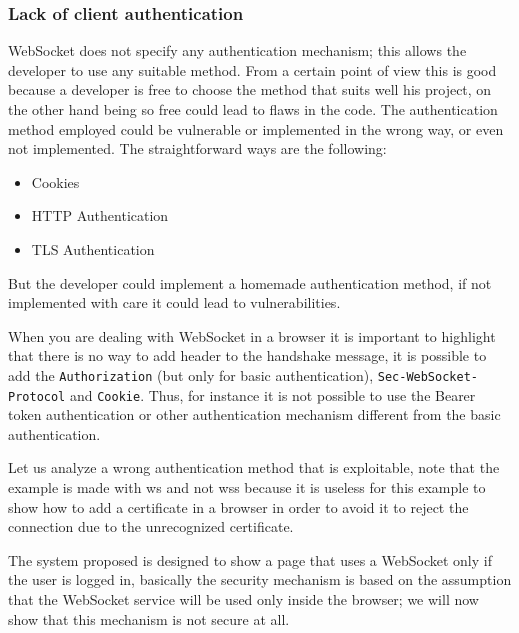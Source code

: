 	
	\subsubsection{Lack of client authentication}\label{sssec:lack}
	WebSocket does not specify any authentication mechanism; this allows the developer to use any suitable method.
	From a certain point of view this is good because a developer is free to choose the method that suits well his project, on the other hand being so free could lead to flaws in the code.\newline
	The authentication method employed could be vulnerable or implemented in the wrong way, or even not implemented.\newline
	The straightforward ways are the following:
	\begin{itemize}
		\item Cookies
		\item HTTP Authentication
		\item TLS Authentication
	\end{itemize}

	But the developer could implement a homemade authentication method, if not implemented with care it could lead to vulnerabilities.\newline
	
	When you are dealing with WebSocket in a browser it is important to highlight that there is no way to add header to the handshake message, it is possible to add the \texttt{Authorization} (but only for basic authentication), \texttt{Sec-WebSocket-Protocol} and \texttt{Cookie}.\newline
	Thus, for instance it is not possible to use the Bearer token authentication or other authentication mechanism different from the basic authentication.\newline
	
	Let us analyze a wrong authentication method that is exploitable, note that the example is made with ws and not wss because it is useless for this example to show how to add a certificate in a browser in order to avoid it to reject the connection due to the unrecognized certificate.\newline
	
	The system proposed is designed to show a page that uses a WebSocket only if the user is logged in, basically the security mechanism is based on the assumption that the WebSocket service will be used only inside the browser; we will now show that this mechanism is not secure at all.
	
